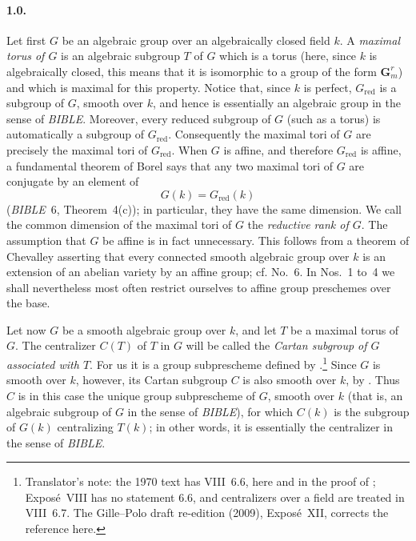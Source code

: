 \paragraph{\textbf{1.0.}}
Let first \(G\) be an algebraic group over an algebraically closed
field \(k\). A \emph{maximal torus of \(G\)} is an algebraic subgroup
\(T\) of \(G\) which is a torus (here, since \(k\) is algebraically
closed, this means that it is isomorphic to a group of the form
\(\mathbf G_m^r\)) and which is maximal for this property. Notice that,
since \(k\) is perfect, \(G_{\mathrm{red}}\) is a subgroup of \(G\),
smooth over \(k\), and hence is essentially an algebraic group in the
sense of \emph{BIBLE}. Moreover, every reduced subgroup of \(G\) (such
as a torus) is automatically a subgroup of \(G_{\mathrm{red}}\).
Consequently the maximal tori of \(G\) are precisely the maximal tori
of \(G_{\mathrm{red}}\). When \(G\) is affine, and therefore
\(G_{\mathrm{red}}\) is affine, a fundamental theorem of Borel says
that any two maximal tori of \(G\) are conjugate by an element of
\[
  G(k)=G_{\mathrm{red}}(k)
\]
(\emph{BIBLE}~6, Theorem~4(c)); in particular, they have the same
dimension. We call the common dimension of the maximal tori of \(G\)
the \emph{reductive rank of \(G\)}. The assumption that \(G\) be affine
is in fact unnecessary. This follows from a theorem of Chevalley
asserting that every connected smooth algebraic group over \(k\) is an
extension of an abelian variety by an affine group; cf. No.~6. In
Nos.~1 to~4 we shall nevertheless most often restrict ourselves to
affine group preschemes over the base.

Let now \(G\) be a smooth algebraic group over \(k\), and let \(T\) be
a maximal torus of \(G\). The centralizer \(C(T)\) of \(T\) in \(G\)
will be called the \emph{Cartan subgroup of \(G\) associated with
\(T\)}. For us it is a group subprescheme defined by .\footnote{Translator's note: the 1970 text
has VIII~6.6, here and in the proof of ; Exposé~VIII has no statement
6.6, and centralizers over a field are treated in VIII~6.7. The Gille--Polo draft re-edition (2009),
Exposé~XII, corrects the reference here.} Since
\(G\) is smooth over \(k\), however, its Cartan subgroup \(C\) is also
smooth over \(k\), by . Thus \(C\) is in this case the unique
group subprescheme of \(G\), smooth over \(k\) (that is, an algebraic
subgroup of \(G\) in the sense of \emph{BIBLE}), for which \(C(k)\) is
the subgroup of \(G(k)\) centralizing \(T(k)\); in other words, it is
essentially the centralizer in the sense of \emph{BIBLE}.

